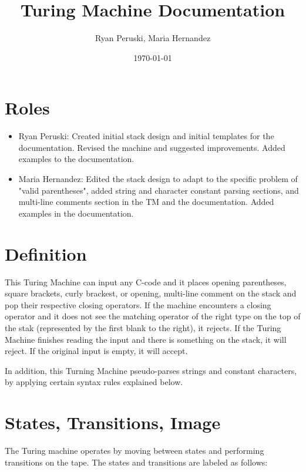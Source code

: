 \documentclass{article}
\title{Turing Machine Documentation}
\author{Ryan Peruski, Maria Hernandez}
\date{\today}
\begin{document}
\maketitle
\section{Roles}

\begin{itemize}
    \item Ryan Peruski: Created initial stack design and initial templates for the documentation. Revised the machine and suggested improvements. Added examples to the documentation.
    \item Maria Hernandez: Edited the stack design to adapt to the specific problem of "valid parentheses", added string and character constant parsing sections, and multi-line comments section
    in the TM and the documentation. Added examples in the documentation.
\end{itemize}

\section{Definition}
This Turing Machine can input any C-code and it places opening parentheses, square brackets, curly brackest, or opening,
multi-line comment on the stack and pop their respective closing operators. If the machine encounters a closing operator and 
it does not see the matching operator of the right type on the top of the stak (represented by the first blank to the right), 
it rejects. If the Turing Machine finishes reading the input and there is something on the stack, it will reject. 
If the original input is empty, it will accept. 

In addition, this Turning Machine pseudo-parses strings and constant characters, by applying certain syntax rules explained below. 

\section{States, Transitions, Image}
The Turing machine operates by moving between states and performing transitions on the tape. The states and transitions are labeled as follows:
\end{document}
